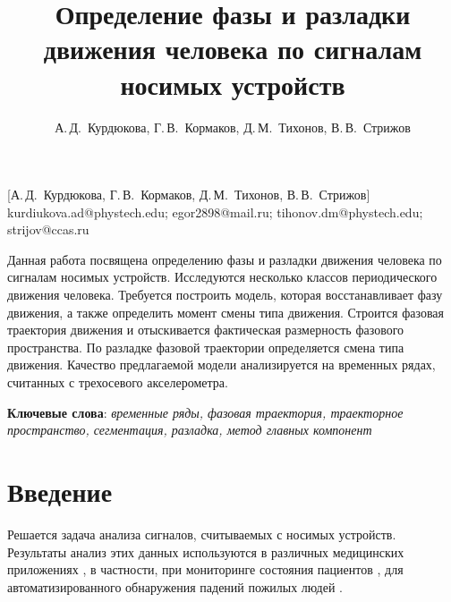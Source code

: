 \documentclass[12pt, twoside]{article}
\theoremstyle{definition}
\begin{document}
\title
    [] %
    {Определение фазы и разладки движения человека по сигналам носимых устройств}
\author
    [А.\,Д.~Курдюкова] %
    {А.\,Д.~Курдюкова, Г.\,В.~Кормаков, Д.\,М.~Тихонов, В.\,В.~Стрижов} %
    [А.\,Д.~Курдюкова, Г.\,В.~Кормаков, Д.\,М.~Тихонов, В.\,В.~Стрижов] %
\email
   {kurdiukova.ad@phystech.edu; egor2898@mail.ru; tihonov.dm@phystech.edu;  strijov@ccas.ru}
\abstract
  {Данная работа посвящена определению фазы и разладки движения человека по сигналам носимых устройств. Исследуются несколько классов периодического движения человека. Требуется построить модель, которая восстанавливает фазу движения, а также определить момент смены типа движения. Строится фазовая траектория движения и отыскивается фактическая размерность фазового пространства. По разладке фазовой траектории определяется смена типа движения. Качество предлагаемой модели анализируется на временных рядах, считанных с трехосевого акселерометра.

\bigskip
\noindent
\textbf{Ключевые слова}: \emph {временные ряды, фазовая траектория, траекторное пространство,  сегментация, разладка, метод главных компонент}
}

\doi{}
\receivedRus{}
\receivedEng{}

\maketitle
\linenumbers

\section{Введение}
Решается задача анализа сигналов, считываемых с носимых устройств. Результаты анализ этих данных используются в различных медицинских приложениях \cite{bussmann1998ambulatory, najafi2003ambulatory}, в частности, при мониторинге состояния пациентов \cite{grunerbl2014smartphone}, для автоматизированного обнаружения падений пожилых людей \cite{ma2014depth}.
\end{document}
